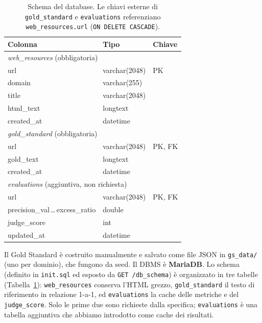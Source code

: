 \documentclass[11pt]{article}
\begin{document}
\begin{table}[h]
\centering
\small
\begin{tabular}{lll}
\toprule
\textbf{Colonna} & \textbf{Tipo} & \textbf{Chiave}\\
\midrule
\multicolumn{3}{l}{\emph{web\_resources} (obbligatoria)}\\
\quad url         & varchar(2048) & PK \\
\quad domain      & varchar(255)  & \\
\quad title       & varchar(2048) & \\
\quad html\_text  & longtext      & \\
\quad created\_at & datetime      & \\
\midrule
\multicolumn{3}{l}{\emph{gold\_standard} (obbligatoria)}\\
\quad url         & varchar(2048) & PK, FK \\
\quad gold\_text  & longtext      & \\
\quad created\_at & datetime      & \\
\midrule
\multicolumn{3}{l}{\emph{evaluations} (aggiuntiva, non richiesta)}\\
\quad url                 & varchar(2048) & PK, FK \\
\quad precision\_val\,\ldots\,excess\_ratio & double & \\
\quad judge\_score        & int           & \\
\quad updated\_at         & datetime      & \\
\bottomrule
\end{tabular}
\caption{Schema del database. Le chiavi esterne di \texttt{gold\_standard} e \texttt{evaluations} referenziano \texttt{web\_resources.url} (\texttt{ON DELETE CASCADE}).}
\label{tab:schema}
\end{table}

Il Gold Standard è costruito manualmente e salvato come file JSON in \texttt{gs\_data/} (uno per dominio), che fungono da seed. Il DBMS è \textbf{MariaDB}. Lo schema (definito in \texttt{init.sql} ed esposto da \texttt{GET /db\_schema}) è organizzato in tre tabelle (Tabella~\ref{tab:schema}): \texttt{web\_resources} conserva l'HTML grezzo, \texttt{gold\_standard} il testo di riferimento in relazione 1-a-1, ed \texttt{evaluations} la cache delle metriche e del \texttt{judge\_score}. Solo le prime due sono richieste dalla specifica; \texttt{evaluations} è una tabella aggiuntiva che abbiamo introdotto come cache dei risultati.
\end{document}
